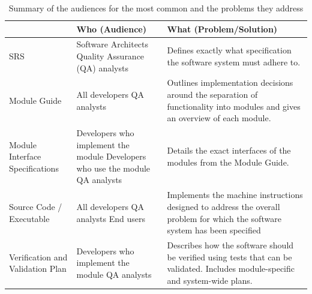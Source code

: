 \begin{table}[h!]
\caption{Summary of the audiences for the most common \sfs{} and the problems
they address}
\label{tab:sfsummary}
\begingroup
\setlength{\tabcolsep}{12pt}
\renewcommand{\arraystretch}{1.3}
\begin{tabular}{|
  >{\raggedright\arraybackslash}p{.2\linewidth} |
  >{\raggedright\arraybackslash}p{.2\linewidth} |
  >{\raggedright\arraybackslash}p{.45\linewidth} |
}
\hline
 \textbf{\SF{}} & \textbf{Who (Audience)} & \textbf{What (Problem/Solution)}
\\ \hline
    SRS & 

    Software Architects \newline \newline
    Quality Assurance (QA) analysts &

    Defines exactly what specification the software system must adhere to. 
\\ \hline
    Module Guide & 

    All developers \newline \newline
    QA analysts  & 

    Outlines implementation decisions around the separation of functionality 
    into modules and gives an overview of each module.
\\ \hline
    Module Interface Specifications & 

    Developers who implement the module \newline \newline
    Developers who use the module \newline \newline
    QA analysts & 

    Details the exact interfaces of the modules from the Module Guide.
\\ \hline
    Source Code / Executable &

    All developers \newline \newline
    QA analysts \newline \newline 
    End users &

    Implements the machine instructions designed to address the overall problem 
    for which the software system has been specified
\\ \hline
    Verification and Validation Plan &

    Developers who implement the module \newline \newline
    QA analysts &

    Describes how the software should be verified using tests that can be 
    validated. Includes module-specific and system-wide plans.
\\ \hline
\end{tabular}
\endgroup
\end{table}

